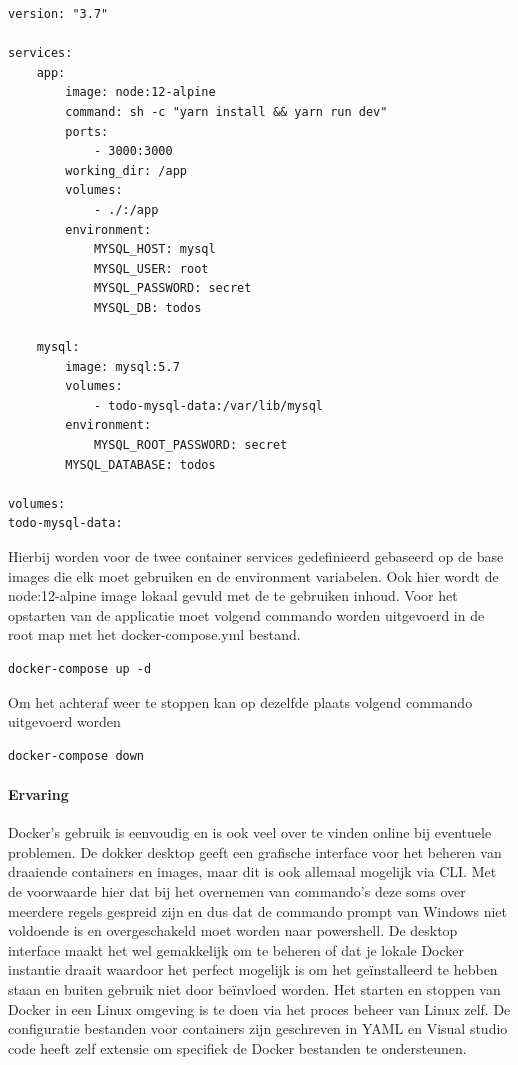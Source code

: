 \begin{lstlisting}[caption=inhoud van de docker-compose.yml,label=lst:Composefile]
version: "3.7"

services:
    app:
        image: node:12-alpine
        command: sh -c "yarn install && yarn run dev"
        ports:
            - 3000:3000
        working_dir: /app
        volumes:
            - ./:/app
        environment:
            MYSQL_HOST: mysql
            MYSQL_USER: root
            MYSQL_PASSWORD: secret
            MYSQL_DB: todos

    mysql:
        image: mysql:5.7
        volumes:
            - todo-mysql-data:/var/lib/mysql
        environment: 
            MYSQL_ROOT_PASSWORD: secret
        MYSQL_DATABASE: todos

volumes:
todo-mysql-data:
\end{lstlisting}
Hierbij worden voor de twee container services gedefinieerd gebaseerd op de base images die elk moet gebruiken en de environment variabelen. Ook hier wordt de node:12-alpine image lokaal gevuld met de te gebruiken inhoud. Voor het opstarten van de applicatie moet volgend commando worden uitgevoerd in de root map met het docker-compose.yml bestand.
\begin{verbatim}
docker-compose up -d
\end{verbatim}
Om het achteraf weer te stoppen kan op dezelfde plaats volgend commando uitgevoerd worden
\begin{verbatim}
docker-compose down 
\end{verbatim}
\paragraph{Ervaring}
Docker’s gebruik is eenvoudig en is ook veel over te vinden online bij eventuele problemen.  De dokker desktop geeft een grafische interface voor het beheren van draaiende containers en images, maar dit is ook allemaal mogelijk via CLI. Met de voorwaarde hier dat bij het overnemen van commando’s deze soms over meerdere regels gespreid zijn en dus dat de commando prompt van Windows niet voldoende is en overgeschakeld moet worden naar powershell.  De desktop interface maakt het wel gemakkelijk om te beheren of dat je lokale Docker instantie draait waardoor het perfect mogelijk is om het geïnstalleerd te hebben staan en buiten gebruik niet door beïnvloed worden. Het starten en stoppen van Docker in een Linux omgeving is te doen via het proces beheer van Linux zelf.  De configuratie bestanden voor containers zijn geschreven in YAML en Visual studio code heeft zelf extensie om specifiek de Docker bestanden te ondersteunen.

